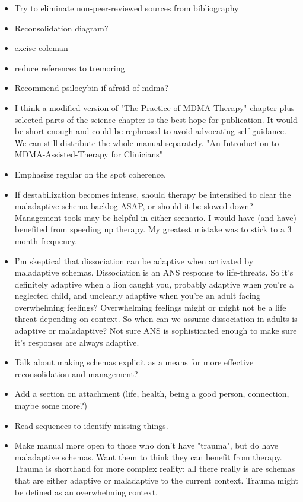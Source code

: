 \documentclass[12pt,letterpaper]{article}
\begin{document}
\begin{itemize}
    \item Try to eliminate non-peer-reviewed sources from bibliography
    \item Reconsolidation diagram?
    \item excise coleman
    \item reduce references to tremoring
    \item Recommend psilocybin if afraid of mdma?
    \item I think a modified version of "The Practice of MDMA-Therapy" chapter plus selected parts of the science chapter is the best hope for publication. It would be short enough and could be rephrased to avoid advocating self-guidance. We can still distribute the whole manual separately. "An Introduction to MDMA-Assisted-Therapy for Clinicians"
    \item Emphasize regular on the spot coherence.
    \item If destabilization becomes intense, should therapy be intensified to clear the maladaptive schema backlog ASAP, or should it be slowed down? Management tools may be helpful in either scenario. I would have (and have) benefited from speeding up therapy. My greatest mistake was to stick to a 3 month frequency.
    \item I'm skeptical that dissociation can be adaptive when activated by maladaptive schemas. Dissociation is an ANS response to life-threats. So it's definitely adaptive when a lion caught you, probably adaptive when you're a neglected child, and unclearly adaptive when you're an adult facing overwhelming feelings? Overwhelming feelings might or might not be a life threat depending on context. So when can we assume dissociation in adults is adaptive or maladaptive? Not sure ANS is sophisticated enough to make sure it's responses are always adaptive.
    \item Talk about making schemas explicit as a means for more effective reconsolidation and management?
    \item Add a section on attachment (life, health, being a good person, connection, maybe some more?)
    \item Read sequences to identify missing things.
    \item Make manual more open to those who don't have "trauma", but do have maladaptive schemas. Want them to think they can benefit from therapy. Trauma is shorthand for more complex reality: all there really is are schemas that are either adaptive or maladaptive to the current context. Trauma might be defined as an overwhelming context.

\end{itemize}
\end{document}
